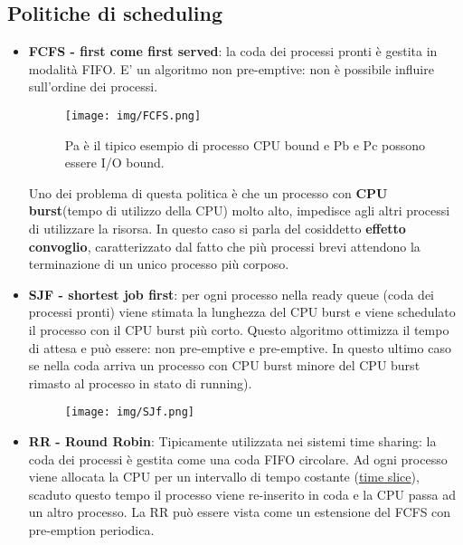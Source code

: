 \documentclass{article}
\begin{document}
\subsection{Politiche di scheduling}
\begin{itemize}
    \item \textbf{FCFS - first come first served}: la coda
    dei processi pronti è gestita in modalità FIFO. 
    E' un algoritmo non pre-emptive: non è possibile influire 
    sull'ordine dei processi.


    \begin{figure}[h!]
        \begin{center}
            \texttt{[image: img/FCFS.png]}  
            
            Pa è il tipico esempio di processo CPU bound e 
            Pb e Pc possono essere I/O bound.
        \end{center}
    \end{figure}


    Uno dei problema di questa politica è che un processo
    con \textbf{CPU burst}(tempo di utilizzo della CPU) molto alto,
    impedisce agli altri processi di utilizzare la risorsa. 
    In questo caso si parla del cosiddetto \textbf{effetto convoglio},
    caratterizzato dal fatto che più processi brevi attendono
    la terminazione di un unico processo più corposo.
    
    \item \textbf{SJF - shortest job first}: per ogni processo
    nella ready queue (coda dei processi pronti) viene 
    stimata la lunghezza del CPU burst e viene schedulato il
    processo con il CPU burst più corto. Questo algoritmo 
    ottimizza il tempo di attesa e può essere: non pre-emptive 
    e pre-emptive. In questo ultimo caso se nella coda
    arriva un processo con CPU burst minore del CPU burst 
    rimasto al processo in stato di running).

    \begin{figure}[h!]
        \begin{center}
            \texttt{[image: img/SJf.png]}  
        \end{center}
    \end{figure}

    \item   \textbf{RR - Round Robin}: Tipicamente utilizzata 
    nei sistemi time sharing: la coda dei processi è gestita
    come una coda FIFO circolare. Ad ogni processo viene 
    allocata la CPU per un intervallo di tempo costante (\underline{time slice}),
    scaduto questo tempo il processo viene re-inserito in coda
    e la CPU passa ad un altro processo. La RR può essere vista
    come un estensione del FCFS con pre-emption periodica.


\end{itemize}
\end{document}
